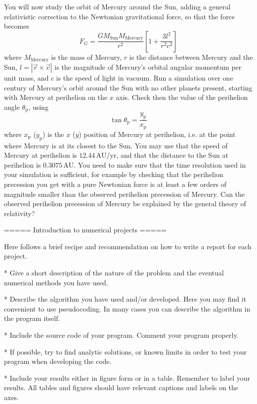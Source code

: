 \documentclass[11pt,a4paper]{article}
\begin{document}
You will now study the orbit of Mercury around the Sun, adding a general relativistic correction to the Newtonian
gravitational force, so that the force becomes
\[
F_G = \frac{GM_\mathrm{Sun}M_\mathrm{Mercury}}{r^2}\left[1 + \frac{3l^2}{r^2c^2}\right]
\]
where $M_\mathrm{Mercury}$ is the mass of Mercury, $r$ is the distance between Mercury and the Sun, $l=|\vec{r}\times\vec{v}|$ is the magnitude of Mercury's orbital angular momentum per unit mass, 
and $c$ is the speed of light in vacuum. Run a simulation 
over one century of Mercury's orbit around the Sun with no other planets present, starting with Mercury at perihelion on the $x$ axis.
Check then the value of the perihelion angle $\theta_\mathrm{p}$, using
\[
\tan \theta_\mathrm{p} = \frac{y_\mathrm{p}}{x_\mathrm{p}}
\]
where $x_\mathrm{p}$ ($y_\mathrm{p}$) is the $x$ ($y$) position of Mercury at perihelion, i.e. at the point
where Mercury is at its closest to the Sun. You may use that the speed of Mercury at perihelion is $12.44\,\mathrm{AU}/\mathrm{yr}$, and that the distance to the Sun
at perihelion is $0.3075\,\mathrm{AU}$.
You need to make sure that the time resolution used in your simulation
is sufficient, for example by checking that the perihelion precession you get with a pure Newtonian force is at least
a few orders of magnitude smaller than the observed perihelion precession of Mercury. Can the observed perihelion 
precession of Mercury be explained by the general theory of relativity?


===== Introduction to numerical projects =====

Here follows a brief recipe and recommendation on how to write a report for each
project.

  * Give a short description of the nature of the problem and the eventual  numerical methods you have used.

  * Describe the algorithm you have used and/or developed. Here you may find it convenient to use pseudocoding. In many cases you can describe the algorithm in the program itself.

  * Include the source code of your program. Comment your program properly.

  * If possible, try to find analytic solutions, or known limits in order to test your program when developing the code.

  * Include your results either in figure form or in a table. Remember to        label your results. All tables and figures should have relevant captions        and labels on the axes.
\end{document}

